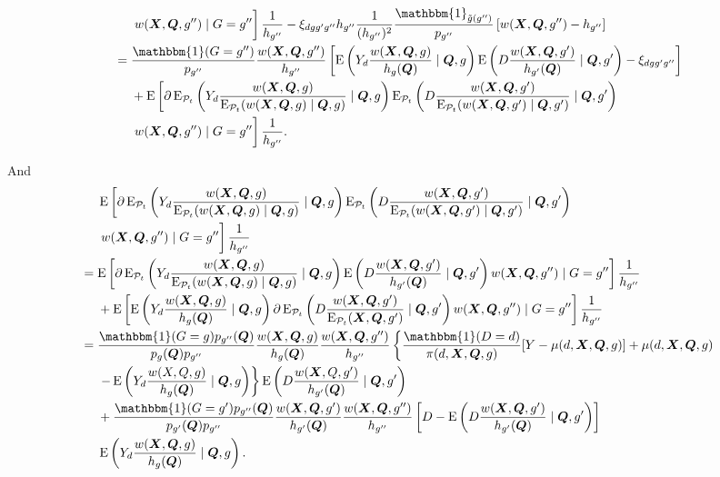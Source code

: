 \documentclass[12pt,a4paper]{article}
\newcommand{\E}{\operatorname{E}}
\def\X{{\boldsymbol X}}
\def\Q{{\boldsymbol Q}}
\def\one{\mathbbm{1}}
\def\pheight{\frac{w(\X,\Q,g')}{\E_{\mathcal{P}_t}(w(\X,\Q,g') \mid \Q,g')}}
\begin{document}
\begin{align*}
    &\phantom{{}={}} \left. \vphantom{\pheight}
    w(\X,\Q,g'') \mid G=g'' \right] \frac{1}{h_{g''}}  -  \xi_{dgg'g''}h_{g''}\frac{1}{(h_{g''})^2}\frac{\one_{\Tilde{g}(g'')}}{p_{g''}}\left[w(\X,\Q,g'')-h_{g''}\right] \\
    &= \frac{\one(G=g'')}{p_{g''}}\frac{w(\X,\Q,g'')}{h_{g''}} \left[ \E \left(Y_d \frac{w(\X,\Q,g)}{h_{g}(\Q)}  \mid \Q, g \right) \E \left(D \frac{w(\X,\Q,g')}{h_{g'}(\Q)} \mid \Q, g' \right) - \xi_{dgg'g''} \right] \\
    &\phantom{{}={}} + \E \left[\partial \E_{\mathcal{P}_t} \left(Y_d \frac{w(\X,\Q,g)}{\E_{\mathcal{P}_t}(w(\X,\Q,g) \mid \Q,g)}  \mid \Q, g \right) \E_{\mathcal{P}_t} \left(D \frac{w(\X,\Q,g')}{\E_{\mathcal{P}_t}(w(\X,\Q,g') \mid \Q,g')} \mid \Q, g' \right) \right. \\ 
    &\phantom{{}={}} \left. \vphantom{\pheight}
    w(\X,\Q,g'') \mid G=g'' \right] \frac{1}{h_{g''}}.
\end{align*}

And
\begin{align*}
    &\phantom{{}={}} \E \left[\partial \E_{\mathcal{P}_t} \left(Y_d \frac{w(\X,\Q,g)}{\E_{\mathcal{P}_t}(w(\X,\Q,g) \mid \Q,g)}  \mid \Q, g \right) \E_{\mathcal{P}_t} \left(D \frac{w(\X,\Q,g')}{\E_{\mathcal{P}_t}(w(\X,\Q,g') \mid \Q,g')} \mid \Q, g' \right) \right. \\
    &\phantom{{}={}} \left. \vphantom{\pheight}
    w(\X,\Q,g'') \mid G=g'' \right] \frac{1}{h_{g''}} \\
    &= \E \left[\partial \E_{\mathcal{P}_t} \left(Y_d \frac{w(\X,\Q,g)}{\E_{\mathcal{P}_t}(w(\X,\Q,g) \mid \Q,g)}  \mid \Q, g \right) \E \left(D \frac{w(\X,\Q,g')}{h_{g'}(\Q)} \mid \Q, g' \right) w(\X,\Q,g'') \mid G=g'' \right]\frac{1}{h_{g''}} \\
    &\phantom{{}={}} + \E \left[\E \left(Y_d \frac{w(\X,\Q,g)}{h_g(\Q)}  \mid \Q, g \right) \partial  \E_{\mathcal{P}_t} \left(D \frac{w(\X,\Q,g')}{\E_{\mathcal{P}_t}(\X,\Q,g')} \mid \Q, g' \right) w(\X,\Q,g'') \mid G=g'' \right]\frac{1}{h_{g''}} \\
    &= \frac{\one(G=g) p_{g''}(\Q)}{p_g(\Q)p_{g''}} \frac{w(\X,\Q,g)}{h_g(\Q)} \frac{w(\X,\Q,g'')}{h_{g''}} \left\{ \frac{\one(D=d)}{\pi(d,\X,\Q,g)} [Y-\mu(d,\X,\Q,g)]+\mu(d,\X,\Q,g) \right. \\
    &\phantom{{}={}} \left. - \E \left(Y_d \frac{w(X,Q,g)}{h_g(\Q)} \mid \Q,g \right) \right\} \E \left(D \frac{w(\X,Q,g')}{h_{g'}(\Q)} \mid \Q,g' \right) \\
    &\phantom{{}={}} + \frac{\one(G=g')p_{g''}(\Q)}{p_{g'}(\Q)p_{g''}} \frac{w(\X,\Q,g')}{h_{g'}(\Q)} \frac{w(\X,\Q,g'')}{h_{g''}} \left[ D-\E \left(D \frac{w(\X,\Q,g')}{h_{g'}(\Q)} \mid \Q, g' \right) \right] \\
    &\phantom{{}={}} \E\left( Y_d \frac{w(\X,\Q,g)}{h_g(\Q)} \mid \Q, g \right).
\end{align*}
\end{document}
